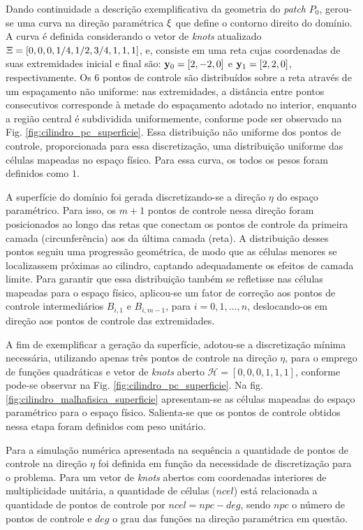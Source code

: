 \documentclass[tese_patricia]{subfiles}
\begin{document}
Dando continuidade a descrição exemplificativa da geometria do \textit{patch} $P_0$, gerou-se uma curva na direção paramétrica $\xi$ que define o contorno direito do domínio. A curva é definida considerando o vetor de \textit{knots} atualizado $\Xi=\left[0,0,0,1/4,1/2,3/4,1,1,1\right]$, e,  consiste em uma reta cujas coordenadas de suas extremidades inicial e final são: $\mathbf{y}_0 =[2,-2,0]$ e $\mathbf{y}_1 =[2, 2 ,0]$, respectivamente. Os $6$ pontos de controle são distribuídos sobre a reta através de um espaçamento não uniforme: nas extremidades, a distância entre pontos consecutivos corresponde à metade do espaçamento adotado no interior, enquanto a região central é subdividida uniformemente, conforme pode ser observado na Fig. \ref{fig:cilindro_pc_superficie}. Essa distribuição não uniforme dos pontos de controle, proporcionada para essa discretização, uma distribuição uniforme das células mapeadas no espaço físico. Para essa curva, os todos os pesos foram definidos como $1$.

A superfície do domínio foi gerada discretizando-se a direção $\eta$ do espaço paramétrico. Para isso, os $m+1$ pontos de controle nessa direção foram posicionados ao longo das retas que conectam os pontos de controle da primeira camada (circunferência) aos da última camada (reta). A distribuição desses pontos seguiu uma progressão geométrica, de modo que as células menores se localizassem próximas ao cilindro, captando adequadamente os efeitos de camada limite. Para garantir que essa distribuição também se refletisse nas células mapeadas para o espaço físico, aplicou-se um fator de correção aos pontos de controle intermediários $B_{i,1}$ e $B_{i,m-1}$, para $i = 0, 1, \dots , n$, deslocando-os em direção aos pontos de controle das extremidades.

A fim de exemplificar a geração da superfície, adotou-se a discretização mínima necessária, utilizando apenas três pontos de controle na direção $\eta$, para o emprego de funções quadráticas e vetor de \textit{knots} aberto $\mathcal{H}=[0,0,0,1,1,1]$, conforme pode-se observar na Fig. \ref{fig:cilindro_pc_superficie}. Na fig. \ref{fig:cilindro_malhafisica_superficie} apresentam-se as células mapeadas do espaço paramétrico para o espaço físico. Salienta-se que os pontos de controle obtidos nessa etapa foram definidos com peso unitário.

Para a simulação numérica apresentada na sequência a quantidade de pontos de controle na direção $\eta$ foi definida em função da necessidade de discretização para o problema. Para um vetor de \textit{knots} abertos com coordenadas interiores de multiplicidade unitária, a quantidade de células ($ncel$) está relacionada a quantidade de pontos de controle por $ncel = npc-deg$, sendo $npc$ o número de pontos de controle e $deg$ o grau das funções na direção paramétrica em questão.
\end{document}
